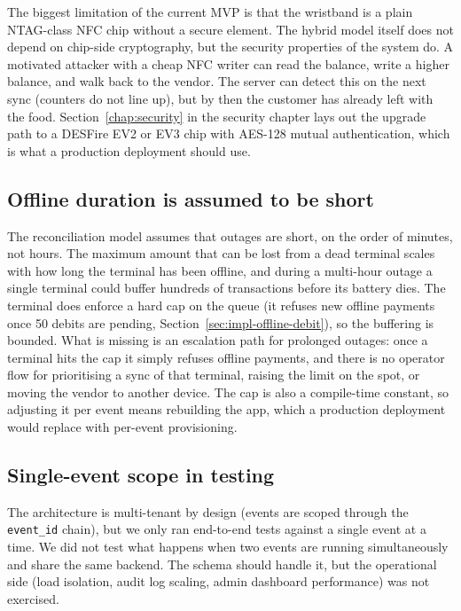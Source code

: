 The biggest limitation of the current MVP is that the wristband is a plain NTAG-class NFC chip without a secure element. The hybrid model itself does not depend on chip-side cryptography, but the security properties of the system do. A motivated attacker with a cheap NFC writer can read the balance, write a higher balance, and walk back to the vendor. The server can detect this on the next sync (counters do not line up), but by then the customer has already left with the food. Section~\ref{chap:security} in the security chapter lays out the upgrade path to a DESFire EV2 or EV3 chip with AES-128 mutual authentication, which is what a production deployment should use.

\subsection{Offline duration is assumed to be short}
\label{subsec:limitation-offline-duration}

The reconciliation model assumes that outages are short, on the order of minutes, not hours. The maximum amount that can be lost from a dead terminal scales with how long the terminal has been offline, and during a multi-hour outage a single terminal could buffer hundreds of transactions before its battery dies. The terminal does enforce a hard cap on the queue (it refuses new offline payments once 50 debits are pending, Section~\ref{sec:impl-offline-debit}), so the buffering is bounded. What is missing is an escalation path for prolonged outages: once a terminal hits the cap it simply refuses offline payments, and there is no operator flow for prioritising a sync of that terminal, raising the limit on the spot, or moving the vendor to another device. The cap is also a compile-time constant, so adjusting it per event means rebuilding the app, which a production deployment would replace with per-event provisioning.

\subsection{Single-event scope in testing}
\label{subsec:limitation-single-event}

The architecture is multi-tenant by design (events are scoped through the \texttt{event\_id} chain), but we only ran end-to-end tests against a single event at a time. We did not test what happens when two events are running simultaneously and share the same backend. The schema should handle it, but the operational side (load isolation, audit log scaling, admin dashboard performance) was not exercised.

